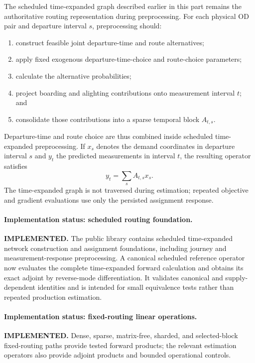 The scheduled time-expanded graph described earlier in this part remains the
authoritative routing representation during preprocessing.  For each physical
OD pair and departure interval $s$, preprocessing should:
\begin{enumerate}
\item construct feasible joint departure-time and route alternatives;
\item apply fixed exogenous departure-time-choice and route-choice parameters;
\item calculate the alternative probabilities;
\item project boarding and alighting contributions onto measurement interval
  $t$; and
\item consolidate those contributions into a sparse temporal block $A_{t,s}$.
\end{enumerate}
Departure-time and route choice are thus combined inside scheduled
time-expanded preprocessing.  If $x_s$ denotes the demand coordinates in
departure interval $s$ and $y_t$ the predicted measurements in interval $t$,
the resulting operator satisfies
\begin{equation}
  y_t=\sum_s A_{t,s}x_s.
  \label{eq:temporal-block-forward-map}
\end{equation}
The time-expanded graph is not traversed during estimation; repeated objective
and gradient evaluations use only the persisted assignment response.

\paragraph{Implementation status: scheduled routing foundation.}
\textbf{IMPLEMENTED.}  The public library contains scheduled time-expanded
network construction and assignment foundations, including journey and
measurement-response preprocessing.  A canonical scheduled reference operator
now evaluates the complete time-expanded forward calculation and obtains its
exact adjoint by reverse-mode differentiation.  It validates canonical and
supply-dependent identities and is intended for small equivalence tests rather
than repeated production estimation.

\paragraph{Implementation status: fixed-routing linear operations.}
\textbf{IMPLEMENTED.}  Dense, sparse, matrix-free, sharded, and selected-block
fixed-routing paths provide tested forward products; the relevant estimation
operators also provide adjoint products and bounded operational controls.


